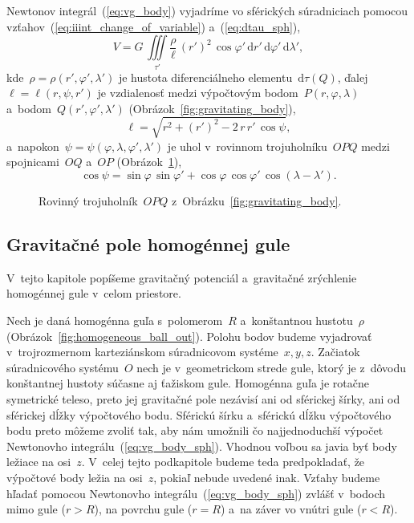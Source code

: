 \documentclass[a4paper, 12pt]{book}
\newcommand{\diff}{\mathrm d}
\begin{document}
Newtonov integrál~(\ref{eq:vg_body}) vyjadríme vo sférických súradniciach 
pomocou vzťahov~(\ref{eq:iiint_change_of_variable}) a~(\ref{eq:dtau_sph}),
%
\begin{equation}
\label{eq:vg_body_sph}
V = G \, \iiint\limits_{\tau'} \frac{\rho}{\ell} \, (r')^2 \, \cos\varphi' \, 
\diff r' \, \diff \varphi' \, \diff \lambda'{,}
\end{equation}
%
kde~$\rho = \rho(r', \varphi', \lambda')$ je hustota diferenciálneho 
elementu~$\diff\tau(Q)$, ďalej~$\ell = \ell(r, \psi, r')$ je vzdialenosť medzi 
výpočtovým bodom~$P(r, \varphi, \lambda)$ a~bodom~$Q(r', \varphi', \lambda')$ 
(Obrázok~\ref{fig:gravitating_body}),
%
\begin{equation}
\label{eq:l_sph}
\ell = \sqrt{r^2 + (r')^2 - 2 \, r \, r' \, \cos\psi}{,}
\end{equation}
%
a~napokon~$\psi = \psi(\varphi, \lambda, \varphi', \lambda')$ je uhol 
v~rovinnom trojuholníku~$OPQ$ medzi spojnicami~$OQ$ a~$OP$ 
(Obrázok~\ref{fig:distance_l}),
%
\begin{equation}
\label{eq:cospsi}
\cos\psi = \sin\varphi \, \sin\varphi' + \cos\varphi \, \cos\varphi' \,
\cos(\lambda - \lambda'){.}
\end{equation}

\begin{figure}
\centering

\caption{Rovinný trojuholník~$OPQ$ z~Obrázku~\ref{fig:gravitating_body}.}
\label{fig:distance_l}
\end{figure}

\subsection{Gravitačné pole homogénnej gule}
\label{sec:homogeneous_ball_gravitational_field}

V~tejto kapitole popíšeme gravitačný potenciál a~gravitačné zrýchlenie 
homogénnej gule v~celom priestore.

Nech je daná homogénna guľa s~polomerom~$R$ a~konštantnou hustotu~$\rho$ 
(Obrázok~\ref{fig:homogeneous_ball_out}).  Polohu bodov budeme vyjadrovať 
v~trojrozmernom karteziánskom súradnicovom systéme~$x, y, z$.  Začiatok 
súradnicového systému~$O$ nech je v~geometrickom strede gule, ktorý je z~dôvodu 
konštantnej hustoty súčasne aj ťažiskom gule.  Homogénna guľa je rotačne 
symetrické teleso, preto jej gravitačné pole nezávisí ani od sférickej šírky, 
ani od sférickej dĺžky výpočtového bodu.  Sférickú šírku a~sférickú dĺžku 
výpočtového bodu preto môžeme zvoliť tak, aby nám umožnili čo najjednoduchší 
výpočet Newtonovho integrálu~(\ref{eq:vg_body_sph}).  Vhodnou voľbou sa javia 
byť body ležiace na osi~$z$.  V~celej tejto podkapitole budeme teda 
predpokladať, že výpočtové body ležia na osi~$z$, pokiaľ nebude uvedené inak.  
Vzťahy budeme hľadať pomocou Newtonovho integrálu~(\ref{eq:vg_body_sph}) zvlášť 
v~bodoch mimo gule ($r > R$), na povrchu gule ($r = R$) a~na záver vo vnútri 
gule ($r < R$).
\end{document}

